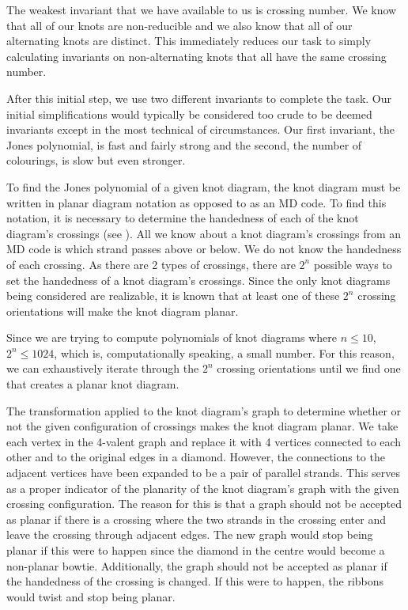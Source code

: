 \begin{paper}
The weakest invariant that we have available to us is crossing number.
We know that all of our knots are non-reducible and we also know that all of our
alternating knots are distinct.
This immediately reduces our task to simply calculating invariants on
non-alternating knots that all have the same crossing number.

After this initial step, we use two different invariants to complete the task.
Our initial simplifications would typically be considered too crude to be deemed
invariants except in the most technical of circumstances.
Our first invariant, the Jones polynomial, is fast and fairly strong and the
second, the number of colourings, is slow but even stronger.



To find the Jones polynomial of a given knot diagram, the knot diagram must be
written in planar diagram notation as opposed to as an MD code.
To find this notation, it is necessary to determine the handedness of each of
the knot diagram's crossings (see \figCrossings).
All we know about a knot diagram's crossings from an MD code is which strand
passes above or below.
We do not know the handedness of each crossing.
As there are 2 types of crossings, there are $2^n$ possible ways to set the
handedness of a knot diagram's crossings.
Since the only knot diagrams being considered are realizable, it is known that
at least one of these $2^n$ crossing orientations will make the knot diagram
planar.

Since we are trying to compute polynomials of knot diagrams where $n\leq10$,
$2^n\leq1024$, which is, computationally speaking, a small number.
For this reason, we can exhaustively iterate through the $2^n$ crossing
orientations until we find one that creates a planar knot diagram.

{The transformation applied to the knot diagram's graph to determine whether or
not the given configuration of crossings makes the knot diagram planar.
We take each vertex in the 4-valent graph and replace it with 4 vertices
connected to each other and to the original edges in a diamond.
However, the connections to the adjacent vertices have been expanded to be a
pair of parallel strands.
This serves as a proper indicator of the planarity of the knot diagram's graph
with the given crossing configuration.
The reason for this is that a graph should not be accepted as planar if there is
a crossing where the two strands in the crossing enter and leave the crossing
through adjacent edges.
The new graph would stop being planar if this were to happen since the diamond
in the centre would become a non-planar bowtie.
Additionally, the graph should not be accepted as planar if the handedness of
the crossing is changed.
If this were to happen, the ribbons would twist and stop being planar.}


\end{paper}
